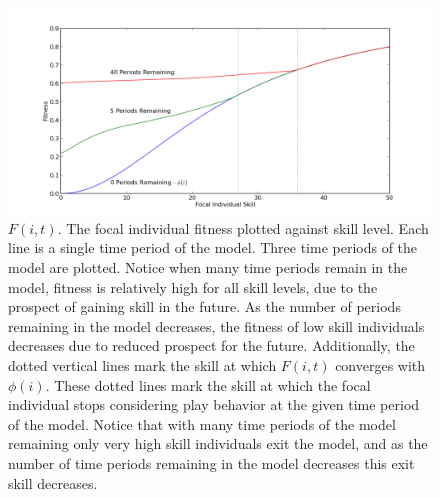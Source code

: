 \documentclass[12pt,letterpaper]{article}
\begin{document}
	\begin{figure}[h]
	\begin{center}
	\caption{$F(i,t)$. The focal individual fitness plotted against skill level. Each line is a single time period of the model. Three time periods of the model are plotted. Notice when many time periods remain in the model, fitness is relatively high for all skill levels, due to the prospect of gaining skill in the future. As the number of periods remaining in the model decreases, the fitness of low skill individuals decreases due to reduced prospect for the future. Additionally, the dotted vertical lines mark the skill at which $F(i,t)$ converges with $\phi(i)$. These dotted lines mark the skill at which the focal individual stops considering play behavior at the given time period of the model. Notice that with many time periods of the model remaining only very high skill individuals exit the model, and as the number of time periods remaining in the model decreases this exit skill decreases.  }
	\includegraphics[width=160mm]{fitness.pdf}
	\end{center}
	\label{fit}
	\end{figure}
	
\end{document}
